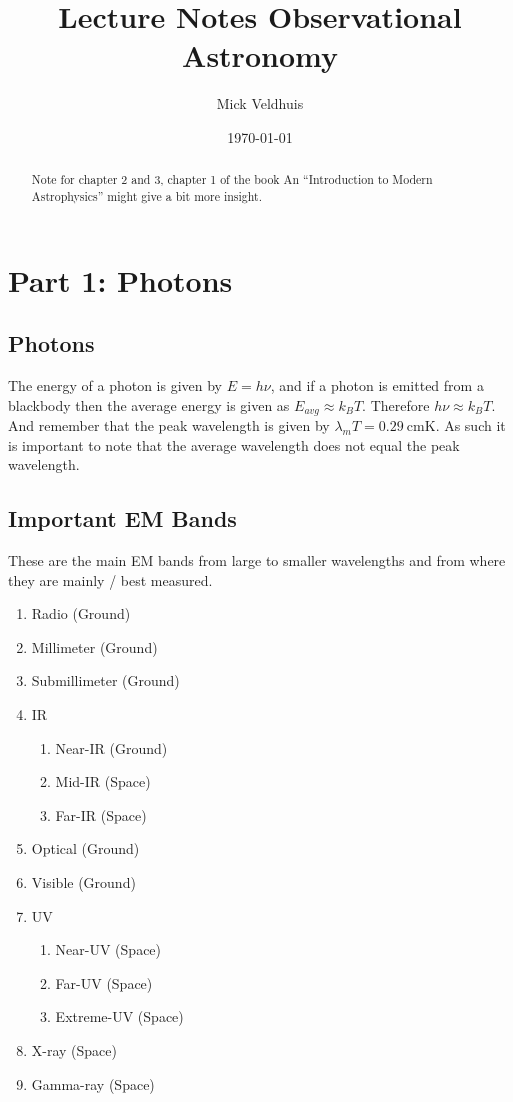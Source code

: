 \documentclass[a4paper]{article}
\title{Lecture Notes Observational Astronomy}
\author{Mick Veldhuis}
\date{\today}
\begin{document}
\maketitle

\begin{abstract}
    Note for chapter 2 and 3, chapter 1 of the book An ``Introduction to Modern Astrophysics'' might give a bit more insight.
\end{abstract}

\tableofcontents

\section{Part 1: Photons}

\subsection{Photons}
The energy of a photon is given by $E=h\nu$, and if a photon is emitted from a blackbody then the average energy is given as $E_{avg}\approx k_BT$. Therefore $h\nu\approx k_BT$. And remember that the peak wavelength is given by $\lambda_m T=0.29 \ \si{\centi\meter\kelvin}$. As such it is important to note that the average wavelength does not equal the peak wavelength.

\subsection{Important EM Bands}
These are the main EM bands from large to smaller wavelengths and from where they are mainly / best measured.
\begin{enumerate}
    \item Radio (Ground)
    \item Millimeter (Ground)
    \item Submillimeter (Ground)
    \item IR 
    \begin{enumerate}
        \item Near-IR (Ground)
        \item Mid-IR (Space)
        \item Far-IR (Space)
    \end{enumerate}
    \item Optical (Ground)
    \item Visible (Ground)
    \item UV 
    \begin{enumerate}    
        \item Near-UV (Space)
        \item Far-UV (Space)
        \item Extreme-UV (Space)
    \end{enumerate}
    \item X-ray (Space)
    \item Gamma-ray (Space)
\end{enumerate}
\end{document}
